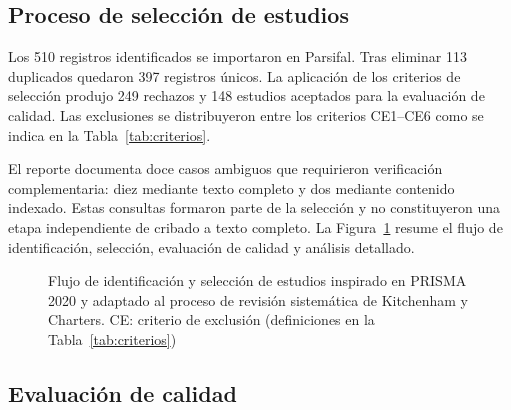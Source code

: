 \documentclass[pdflatex,sn-mathphys-num]{sn-jnl}%
\theoremstyle{thmstyleone}%
\theoremstyle{thmstyletwo}%
\theoremstyle{thmstylethree}%
\begin{document}
\FloatBarrier
\subsection{Proceso de selección de estudios}\label{subsec:seleccion}

Los 510 registros identificados se importaron en Parsifal. Tras eliminar 113 duplicados quedaron 397 registros únicos. La aplicación de los criterios de selección produjo 249 rechazos y 148 estudios aceptados para la evaluación de calidad. Las exclusiones se distribuyeron entre los criterios CE1--CE6 como se indica en la Tabla~\ref{tab:criterios}.

El reporte documenta doce casos ambiguos que requirieron verificación complementaria: diez mediante texto completo y dos mediante contenido indexado. Estas consultas formaron parte de la selección y no constituyeron una etapa independiente de cribado a texto completo. La Figura~\ref{fig:prisma-argus} resume el flujo de identificación, selección, evaluación de calidad y análisis detallado.

\FloatBarrier
\begin{figure}[!t]
\centering

\caption{Flujo de identificación y selección de estudios inspirado en PRISMA 2020 y adaptado al proceso de revisión sistemática de Kitchenham y Charters. CE: criterio de exclusión (definiciones en la Tabla~\ref{tab:criterios})}\label{fig:prisma-argus}
\end{figure}

\FloatBarrier
\subsection{Evaluación de calidad}\label{subsec:calidad}
\end{document}
